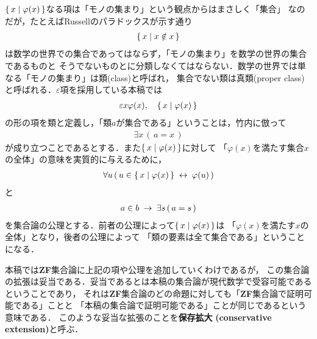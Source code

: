 	$\{\, x \mid \varphi(x)\, \}$なる項は「モノの集まり」という観点からはまさしく「集合」
	なのだが，たとえばRussellのパラドックスが示す通り
	\begin{align}
		\{\, x \mid x \notin x\, \}
	\end{align}
	は数学の世界での集合であってはならず，「モノの集まり」を数学の世界の集合であるものと
	そうでないものとに分類しなくてはならない．数学の世界では単なる「モノの集まり」は類(class)と呼ばれ，
	集合でない類は真類(proper class)と呼ばれる．$\varepsilon$項を採用している本稿では
	\begin{align}
		\varepsilon x \varphi(x),\quad \{\, x \mid \varphi(x)\, \}
	\end{align}
	の形の項を類と定義し，「類$a$が集合である」ということは，竹内\cite{key4}に倣って
	\begin{align}
		\exists x\, (\, a = x\, )
	\end{align}
	が成り立つことであるとする．また$\{\, x \mid \varphi(x)\, \}$に対して
	「$\varphi(x)$を満たす集合$x$の全体」の意味を実質的に与えるために，
	\begin{align}
		\forall u\, (\, u \in \{\, x \mid \varphi(x)\, \} \hspace{0.25em}\leftrightarrow\hspace{0.25em} \varphi(u)\, )
	\end{align}
	と
	\begin{align}
		a \in b \hspace{0.25em}\rightarrow\hspace{0.25em} \exists s\, (\, a = s\, )
	\end{align}
	を集合論の公理とする．前者の公理によって$\{\, x \mid \varphi(x)\, \}$は
	「$\varphi(x)$を満たす$x$の全体」となり，後者の公理によって
	「類の要素は全て集合である」ということになる．
	
	本稿では{\bf ZF}集合論に上記の項や公理を追加していくわけであるが，
	この集合論の拡張は妥当である．妥当であるとは本稿の集合論が現代数学で受容可能であるということであり，
	それは{\bf ZF}集合論のどの命題に対しても「{\bf ZF}集合論で証明可能である」ことと
	「本稿の集合論で証明可能である」ことが同じであるという意味である．
	このような妥当な拡張のことを{\bf 保存拡大}
	{\bf (conservative extension)}と呼ぶ．
	
